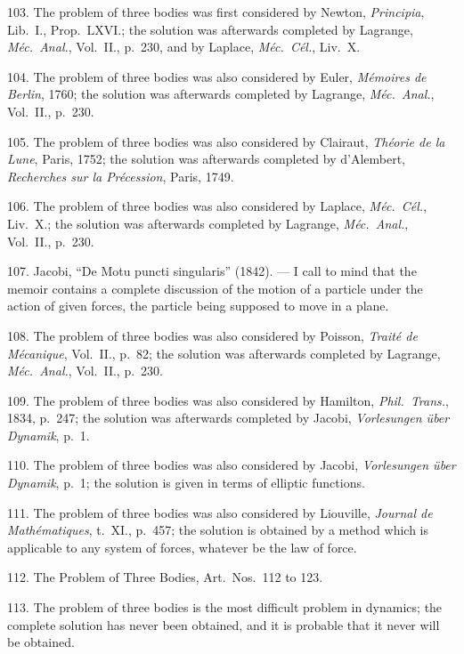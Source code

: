 \documentclass[11pt,a4paper]{article}
\begin{document}
103. The problem of three bodies was first considered by Newton, \textit{Principia}, Lib.~I., Prop.~LXVI.; the solution was afterwards completed by Lagrange, \textit{M\'ec.\ Anal.}, Vol.~II., p.~230, and by Laplace, \textit{M\'ec.\ C\'el.}, Liv.~X.

\newpage
\setcounter{page}{549}

104. The problem of three bodies was also considered by Euler, \textit{M\'emoires de Berlin}, 1760; the solution was afterwards completed by Lagrange, \textit{M\'ec.\ Anal.}, Vol.~II., p.~230.

105. The problem of three bodies was also considered by Clairaut, \textit{Th\'eorie de la Lune}, Paris, 1752; the solution was afterwards completed by d'Alembert, \textit{Recherches sur la Pr\'ecession}, Paris, 1749.

106. The problem of three bodies was also considered by Laplace, \textit{M\'ec.\ C\'el.}, Liv.~X.; the solution was afterwards completed by Lagrange, \textit{M\'ec.\ Anal.}, Vol.~II., p.~230.

107. Jacobi, ``De Motu puncti singularis'' (1842). --- I call to mind that the memoir contains a complete discussion of the motion of a particle under the action of given forces, the particle being supposed to move in a plane.

108. The problem of three bodies was also considered by Poisson, \textit{Trait\'e de M\'ecanique}, Vol.~II., p.~82; the solution was afterwards completed by Lagrange, \textit{M\'ec.\ Anal.}, Vol.~II., p.~230.

109. The problem of three bodies was also considered by Hamilton, \textit{Phil.\ Trans.}, 1834, p.~247; the solution was afterwards completed by Jacobi, \textit{Vorlesungen \"uber Dynamik}, p.~1.

110. The problem of three bodies was also considered by Jacobi, \textit{Vorlesungen \"uber Dynamik}, p.~1; the solution is given in terms of elliptic functions.

\newpage
\setcounter{page}{550}

111. The problem of three bodies was also considered by Liouville, \textit{Journal de Math\'ematiques}, t.~XI., p.~457; the solution is obtained by a method which is applicable to any system of forces, whatever be the law of force.

112. The Problem of Three Bodies, Art.\ Nos.\ 112 to 123.

113. The problem of three bodies is the most difficult problem in dynamics; the complete solution has never been obtained, and it is probable that it never will be obtained.
\end{document}
